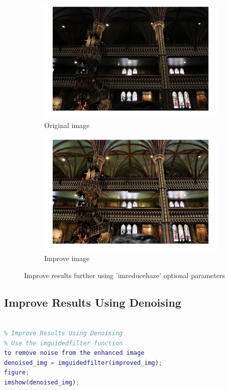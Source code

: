 \documentclass[conference]{IEEEtran}
\begin{document}
\begin{figure}[h!]
\centering
\begin{subfigure}[b]{0.4\linewidth}
\includegraphics[width=\linewidth]{images/img21.jpg}
\caption{Original image}
\end{subfigure}
\begin{subfigure}[b]{0.4\linewidth}
\includegraphics[width=\linewidth]{images/img25.jpg}
\caption{Improve image}
\end{subfigure}
\caption{Improve results further using 'imreducehaze' optional parameters}
\label{fig:Improvement}
\end{figure}

\subsection{Improve Results Using Denoising}

\begin{lstlisting}[language=Matlab]

% Improve Results Using Denoising
% Use the imguidedfilter function 
to remove noise from the enhanced image
denoised_img = imguidedfilter(improved_img);
figure;
imshow(denoised_img);

\end{lstlisting}
\end{document}
